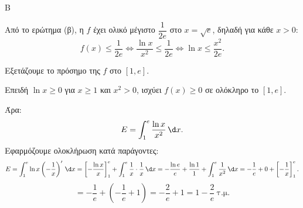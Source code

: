 \begin{thema}{Β}
\begin{erwthma}
\item Από το ερώτημα (β), η $f$ έχει ολικό μέγιστο $\dfrac{1}{2e}$ στο $x=\sqrt{e}$, δηλαδή για κάθε $x>0$:
\[
f(x)\leq\frac{1}{2e} \Leftrightarrow \frac{\ln x}{x^2}\leq\frac{1}{2e} \Leftrightarrow \ln x\leq\frac{x^2}{2e}.\]

\item Εξετάζουμε το πρόσημο της $f$ στο $[1,e]$.

Επειδή $\ln x\geq0$ για $x\geq1$ και $x^2>0$, ισχύει $f(x)\geq0$ σε ολόκληρο το $[1,e]$.

Άρα:
\[
E=\int_1^e\frac{\ln x}{x^2}\,\d x.
\]
Εφαρμόζουμε ολοκλήρωση κατά παράγοντες:
\[
E=\int_1^e\ln{x}\left( -\frac{1}{x}\right)'\,\d x=\left[-\frac{\ln x}{x}\right]_1^e+\int_1^e\frac{1}{x}\cdot\frac{1}{x}\,\d x
=-\frac{\ln e}{e}+\frac{\ln 1}{1}+\int_1^e\frac{1}{x^2}\,\d x
=-\frac{1}{e}+0+\left[-\frac{1}{x}\right]_1^e.
\]
\[
=-\frac{1}{e}+\left(-\frac{1}{e}+1\right)=-\frac{2}{e}+1=1-\frac{2}{e}\ \text{τ.μ.}
\]

\end{erwthma}
\end{thema}

